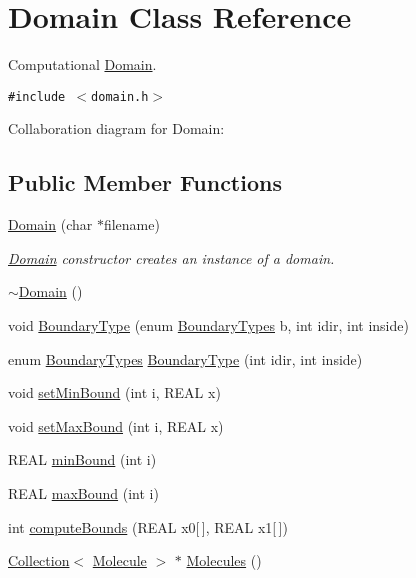 \hypertarget{classDomain}{
\section{Domain Class Reference}
\label{classDomain}
}
Computational \hyperlink{classDomain}{Domain}.  


{\tt \#include $<$domain.h$>$}

Collaboration diagram for Domain:\subsection*{Public Member Functions}
\begin{CompactItemize}
\item 
\hyperlink{classDomain_00a6f779e32f40a899020a4114eb00c9}{Domain} (char $\ast$filename)
\begin{CompactList}\small\item\em \hyperlink{classDomain}{Domain} constructor creates an instance of a domain. \item\end{CompactList}\item 
\hyperlink{classDomain_29cec9afb2e54c810ba1f3c1a49543a8}{$\sim$Domain} ()
\item 
void \hyperlink{classDomain_aa7e3ba77943b470095a43fffff51ea7}{BoundaryType} (enum \hyperlink{domain_8h_81abc9b219bae49710486f00fe2456fa}{BoundaryTypes} b, int idir, int inside)
\item 
enum \hyperlink{domain_8h_81abc9b219bae49710486f00fe2456fa}{BoundaryTypes} \hyperlink{classDomain_040e0b00633af32e4bf293c87932003b}{BoundaryType} (int idir, int inside)
\item 
void \hyperlink{classDomain_7d1404792c54b3832a48561bac4996a3}{setMinBound} (int i, REAL x)
\item 
void \hyperlink{classDomain_dc09d059d5102a38d70714d894be49f0}{setMaxBound} (int i, REAL x)
\item 
REAL \hyperlink{classDomain_80f24f28a5bc6123f6554c01bded983b}{minBound} (int i)
\item 
REAL \hyperlink{classDomain_35f43f47b82f07881f0dd442263e28df}{maxBound} (int i)
\item 
int \hyperlink{classDomain_d648b8279c930c23ae094160bda427ac}{computeBounds} (REAL x0\mbox{[}$\,$\mbox{]}, REAL x1\mbox{[}$\,$\mbox{]})
\item 
\hyperlink{classCollection}{Collection}$<$ \hyperlink{classMolecule}{Molecule} $>$ $\ast$ \hyperlink{classDomain_4357e15e23a5f4d81103672a3c06f8f9}{Molecules} ()

\end{CompactItemize}
